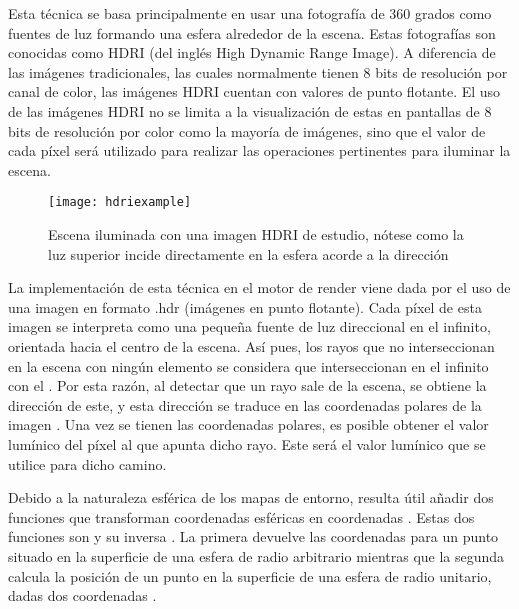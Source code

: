 Esta técnica se basa principalmente en usar una fotografía de 360 grados como fuentes de luz formando una esfera alrededor de la escena. Estas fotografías son conocidas como HDRI (del inglés High Dynamic Range Image). A diferencia de las imágenes tradicionales, las cuales normalmente tienen 8 bits de resolución por canal de color, las imágenes HDRI cuentan con valores de punto flotante. El uso de las imágenes HDRI no se limita a la visualización de estas en pantallas de 8 bits de resolución por color como la mayoría de imágenes, sino que el valor de cada píxel será utilizado para realizar las operaciones pertinentes para iluminar la escena.

		
\begin{figure}[H]
    \centering
	\texttt{[image: hdriexample]}
	\caption{Escena iluminada con una imagen HDRI de estudio, nótese como la luz superior incide directamente en la esfera acorde a la dirección}
	\label{fig:hdriexample}
\end{figure}

La implementación de esta técnica en el motor de render viene dada por el uso de una imagen en formato .hdr (imágenes en punto flotante). Cada píxel de esta imagen se interpreta como una pequeña fuente de luz direccional en el infinito, orientada hacia el centro de la escena. Así pues, los rayos que no interseccionan en la escena con ningún elemento se considera que interseccionan en el infinito con el . Por esta razón, al detectar que un rayo sale de la escena, se obtiene la dirección de este, y esta dirección se traduce en las coordenadas polares de la imagen . Una vez se tienen las coordenadas polares, es posible obtener el valor lumínico del píxel al que apunta dicho rayo. Este será el valor lumínico que se utilice para dicho camino.
	
	
	
	
Debido a la naturaleza esférica de los mapas de entorno, resulta útil añadir dos funciones que transforman coordenadas esféricas en coordenadas . Estas dos funciones son  y su inversa . La primera devuelve las coordenadas  para un punto situado en la superficie de una esfera de radio arbitrario mientras que la segunda calcula la posición de un punto en la superficie de una esfera de radio unitario, dadas dos coordenadas .

\label{sphericalmapping}

